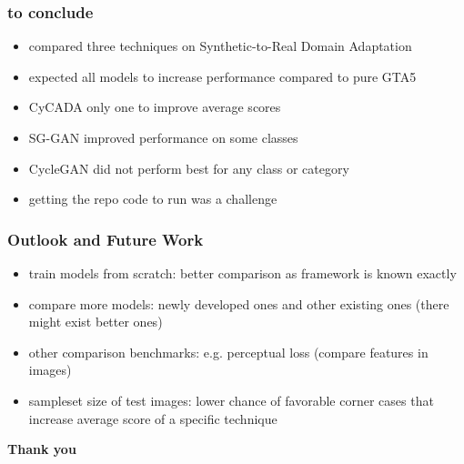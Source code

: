 \documentclass{beamer}
\begin{document}
\begin{frame}
\frametitle{to conclude}
\begin{itemize}
	\item compared three techniques on Synthetic-to-Real Domain Adaptation
	\item expected all models to increase performance compared to pure GTA5
	\item CyCADA only one to improve average scores
	\item SG-GAN improved performance on some classes
	\item CycleGAN did not perform best for any class or category
	\item getting the repo code to run was a challenge
\end{itemize}
\end{frame}

\begin{frame}
\frametitle{Outlook and Future Work}
\begin{itemize}
	\item train models from scratch: better comparison as framework is known exactly
	\item compare more models: newly developed ones and other existing ones (there might exist better ones)
	\item other comparison benchmarks: e.g. perceptual loss (compare features in images)
	\item sampleset size of test images: lower chance of favorable corner cases that increase average score of a specific technique
\end{itemize}
\end{frame}



\begin{frame}
	\begin{center}
		\textbf{Thank you}
	\end{center}
\end{frame}
\end{document}
